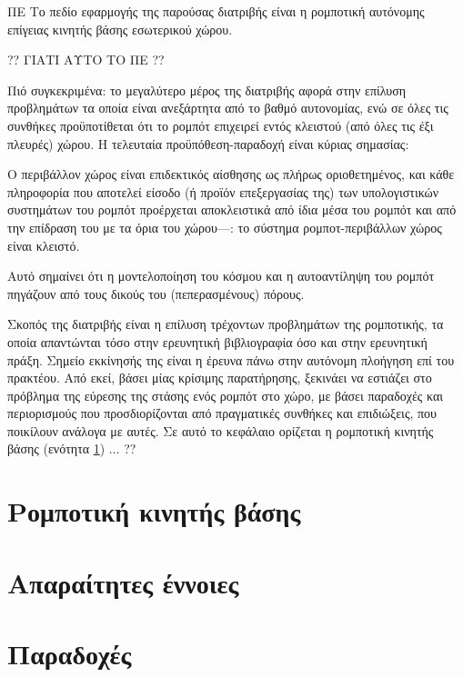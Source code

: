 \begin{bw_box}
\begin{customscope}{ΠΕ}
Το πεδίο εφαρμογής της παρούσας διατριβής είναι η ρομποτική αυτόνομης
επίγειας κινητής βάσης εσωτερικού χώρου.
\label{scope}
\end{customscope}
\end{bw_box}


?? ΓΙΑΤΙ ΑΥΤΟ ΤΟ ΠΕ ??

Πιό συγκεκριμένα: το μεγαλύτερο μέρος της διατριβής αφορά στην επίλυση
προβλημάτων τα οποία είναι ανεξάρτητα από το βαθμό αυτονομίας, ενώ σε όλες τις
συνθήκες προϋποτίθεται ότι το ρομπότ επιχειρεί εντός κλειστού (από όλες τις έξι
πλευρές) χώρου. Η τελευταία προϋπόθεση-παραδοχή είναι κύριας σημασίας:\\

\begin{bw_box}
\begin{assumption}
\label{ass:01_01}
Ο περιβάλλον χώρος είναι επιδεκτικός αίσθησης ως πλήρως οριοθετημένος, και κάθε
πληροφορία που αποτελεί είσοδο (ή προϊόν επεξεργασίας της) των υπολογιστικών
συστημάτων του ρομπότ προέρχεται αποκλειστικά από ίδια μέσα του ρομπότ και
από την επίδραση του με τα όρια του χώρου---: το σύστημα ρομποτ-περιβάλλων
χώρος είναι κλειστό.
\end{assumption}
\end{bw_box}

Αυτό σημαίνει ότι η μοντελοποίηση του κόσμου και η αυτοαντίληψη του ρομπότ
πηγάζουν από τους δικούς του (πεπερασμένους) πόρους.

Σκοπός της διατριβής είναι η επίλυση τρέχοντων προβλημάτων της ρομποτικής, τα
οποία απαντώνται τόσο στην ερευνητική βιβλιογραφία όσο και στην ερευνητική
πράξη. Σημείο εκκίνησής της είναι η έρευνα πάνω στην αυτόνομη πλοήγηση επί του
πρακτέου. Από εκεί, βάσει μίας κρίσιμης παρατήρησης, ξεκινάει να εστιάζει στο
πρόβλημα της εύρεσης της στάσης ενός ρομπότ στο χώρο, με βάσει παραδοχές και
περιορισμούς που προσδιορίζονται από πραγματικές συνθήκες και επιδιώξεις, που
ποικίλουν ανάλογα με αυτές. Σε αυτό το κεφάλαιο ορίζεται η ρομποτική κινητής
βάσης (ενότητα \ref{section:01_01_01}) ... ??


\section{Ρομποτική κινητής βάσης}
\label{section:01_01_01}


\section{Απαραίτητες έννοιες}
\label{section:01_01_02}


\section{Παραδοχές}
\label{section:01_01_03}

